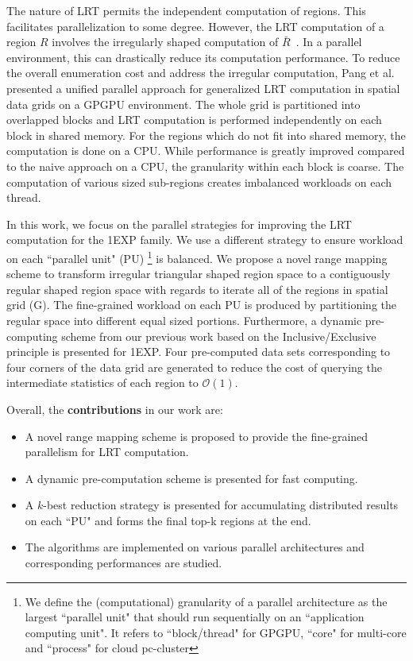\documentclass[AMA,LATO1COL]{WileyNJD-v2}
\newcommand\bigo{\mathcal O}
\begin{document}
\noindent The nature of LRT permits the independent computation of regions. This facilitates parallelization to some degree. However, the LRT computation of a region $R$ involves the irregularly shaped computation of $\bar R$~\cite{apweb}. In a parallel environment, this can drastically reduce its computation performance\cite{irregular1,irregular2,irregular3}.
To reduce the overall enumeration cost and address the irregular computation, Pang et al.~\cite{apweb} presented a unified parallel approach for generalized LRT computation in spatial data grids on a GPGPU environment. The whole grid is partitioned into overlapped blocks and LRT computation is performed independently on each block in shared memory. For the regions which do not fit into shared memory, the computation is done on a CPU. While performance is greatly improved compared to the naive approach on a CPU, the granularity within each block is coarse. The computation of various sized sub-regions creates imbalanced workloads on each thread.

\noindent In this work, we focus on the parallel strategies for improving the LRT computation for the 1EXP family. We use a different strategy to ensure workload on each ``parallel unit" (PU) \footnote{We define the (computational) granularity of a parallel architecture as the largest ``parallel unit" that should run sequentially on an ``application computing unit". It refers to ``block/thread" for GPGPU, ``core" for multi-core and ``process" for cloud pc-cluster} is balanced. We propose a novel range mapping scheme to transform irregular triangular shaped region space to a contiguously regular shaped region space with regards to iterate all of the regions in spatial grid (G). The fine-grained workload on each PU is produced by partitioning the regular space into different equal sized portions. Furthermore, a dynamic pre-computing scheme from our previous work\cite{apweb} based on the Inclusive/Exclusive principle is presented for 1EXP. Four pre-computed data sets corresponding to four corners of the data grid are generated to reduce the cost of querying the intermediate statistics of each region to $\bigo(1)$.

Overall, the {\bf contributions} in our work are:
\begin{itemize}
\renewcommand{\labelitemi}{$\bullet$}
\item A novel range mapping scheme is proposed to provide the fine-grained parallelism for LRT computation.
\item A dynamic pre-computation scheme is presented for fast computing.
\item A $k$-best reduction strategy is presented for accumulating distributed results on each ``PU" and forms the final top-k regions at the end.
\item The algorithms are implemented on various parallel architectures and corresponding performances are studied.
\end{itemize}
\end{document}
